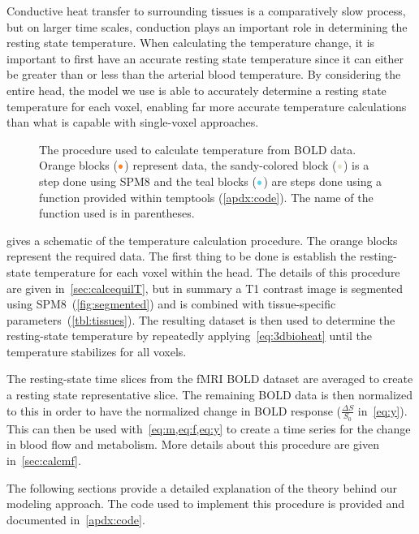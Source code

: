   Conductive heat transfer to surrounding tissues is a comparatively slow process, but on larger time scales, conduction plays an important role in determining the resting state temperature.  When calculating the temperature change, it is important to first have an accurate resting state temperature since it can either be greater than or less than the arterial blood temperature.  By considering the entire head, the model we use is able to accurately determine a resting state temperature for each voxel, enabling far more accurate temperature calculations than what is capable with single-voxel approaches.
  \begin{figure}[tb]
    \vspace{10pt}
    \centering
    
    \caption[Procedure used to calculate temperature change]{\label{fig:procedureflowchart} The procedure used to calculate temperature from BOLD data.  Orange blocks ($\color{goldfish}\bullet$) represent data, the sandy-colored block ($\color{beachstorm}\bullet$) is a step done using SPM8 and the teal blocks ($\color{aoi}\bullet$) are steps done using a function provided within temptools (\cref{apdx:code}).  The name of the function used is in parentheses.}
  \end{figure}
  
   gives a schematic of the temperature calculation procedure.  The orange blocks represent the required data.  The first thing to be done is establish the resting-state temperature for each voxel within the head.  The details of this procedure are given in~\cref{sec:calcequilT}, but in summary a T1 contrast image is segmented using SPM8~(\cref{fig:segmented}) and is combined with tissue-specific parameters~(\cref{tbl:tissues}).  The resulting dataset is then used to determine the resting-state temperature by repeatedly applying~\cref{eq:3dbioheat} until the temperature stabilizes for all voxels.
  
  The resting-state time slices from the fMRI BOLD dataset are averaged to create a resting state representative slice.  The remaining BOLD data is then normalized to this in order to have the normalized change in BOLD response ($\frac{\Delta S}{S_0}$ in~\cref{eq:y}).  This can then be used with~\cref{eq:m,eq:f,eq:y} to create a time series for the change in blood flow and metabolism.  More details about this procedure are given in~\cref{sec:calcmf}.
  
  The following sections provide a detailed explanation of the theory behind our modeling approach.  The code used to implement this procedure is provided and documented in~\cref{apdx:code}.  
  
